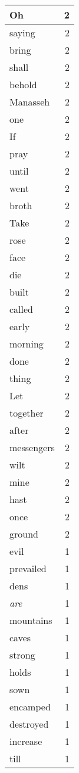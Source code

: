 \begin{center}
\begin{longtable}{l|r}
Oh & 2\\ \hline 
saying & 2\\ \hline 
bring & 2\\ \hline 
shall & 2\\ \hline 
behold & 2\\ \hline 
Manasseh & 2\\ \hline 
one & 2\\ \hline 
If & 2\\ \hline 
pray & 2\\ \hline 
until & 2\\ \hline 
went & 2\\ \hline 
broth & 2\\ \hline 
Take & 2\\ \hline 
rose & 2\\ \hline 
face & 2\\ \hline 
die & 2\\ \hline 
built & 2\\ \hline 
called & 2\\ \hline 
early & 2\\ \hline 
morning & 2\\ \hline 
done & 2\\ \hline 
thing & 2\\ \hline 
Let & 2\\ \hline 
together & 2\\ \hline 
after & 2\\ \hline 
messengers & 2\\ \hline 
wilt & 2\\ \hline 
mine & 2\\ \hline 
hast & 2\\ \hline 
once & 2\\ \hline 
ground & 2\\ \hline 
evil & 1\\ \hline 
prevailed & 1\\ \hline 
dens & 1\\ \hline 
\emph{are} & 1\\ \hline 
mountains & 1\\ \hline 
caves & 1\\ \hline 
strong & 1\\ \hline 
holds & 1\\ \hline 
sown & 1\\ \hline 
encamped & 1\\ \hline 
destroyed & 1\\ \hline 
increase & 1\\ \hline 
till & 1\\ \hline 

\end{longtable}
\end{center}
